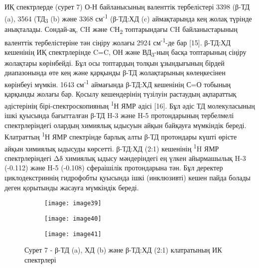 \begin{multicols}{2}
ИҚ спектрлерде (сурет 7) О-Н байланысының валенттік тербелістері 3398
(β-ТД (a), 3564 (ТД\textsubscript{3} (b) және 3368
см\textsuperscript{-1} (β-ТД:ХД (c) аймақтарында кең жолақ түрінде
анықталады. Сондай-ақ, CH және CН\textsubscript{2} топтарындағы CH
байланыстарының валенттік тербелістеріне тән сіңіру жолағы 2924
см\textsuperscript{-1}-де бар {[}15{]}. β-ТД:ХД кешенінің ИҚ
спектрлерінде C=C, ОН және ВД\textsubscript{3}-ның басқа топтарының
сіңіру жолақтары көрінбейді. Бұл осы топтардың толқын ұзындығының бірдей
диапазонында өте кең және қарқынды β-ТД жолақтарының көлеңкесінен
көрінбеуі мүмкін. 1643 см\textsuperscript{-1} аймағында β-ТД:ХД
кешенінің С=О тобының қарқынды жолағы бар. Қосылу кешендерінің түзілуін
растаудың ақпараттық әдістерінің бірі-спектроскопияның
\textsuperscript{1}Н ЯМР әдісі {[}16{]}. Бұл әдіс ТД молекуласының ішкі
қуысында бағытталған β-ТД H-3 және H-5 протондарының тербелмелі
спектрлеріндегі олардың химиялық ыдысуын айқын байқауға мүмкіндік
береді. Клатраттың \textsuperscript{1}Н ЯМР спектрінде барлық алты β-ТД
протондары күшті өрісте айқын химиялық ыдысуды көрсетті. β-ТД:ХД (2:1)
кешенінің \textsuperscript{1}H ЯМР спектрлеріндегі Δδ химиялық ыдысу
мәндеріндегі ең үлкен айырмашылық H-3 (-0.112) және H-5 (-0.108)
сфераішілік протондарына тән. Бұл деректер циклодекстриннің гидрофобты
қуысында ішкі (инклюзивті) кешен пайда болады деген қорытынды жасауға
мүмкіндік береді.
\end{multicols}

\begin{figure}[H]
\centering
\begin{subfigure}[b]{0.45\textwidth}
\centering
\texttt{[image: image39]}
\end{subfigure}
\begin{subfigure}[b]{0.45\textwidth}
\centering
\texttt{[image: image40]}
\end{subfigure}
\begin{subfigure}[b]{0.45\textwidth}
\centering
\texttt{[image: image41]}
\end{subfigure}
\caption*{Сурет 7 - β-ТД (a), ХД (b) және β-ТД:ХД (2:1) клатратының ИК спектрлері}
\end{figure}

